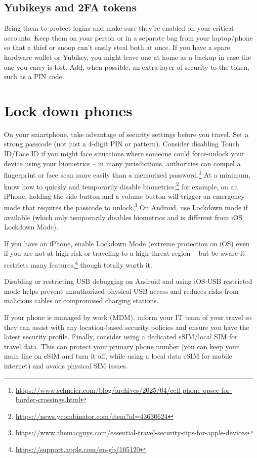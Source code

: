 \subsection{Yubikeys and 2FA tokens}

Bring them to protect logins and make sure they're enabled
on your critical accounts. Keep them on your person or in
a separate bag from your laptop/phone so that a thief or
snoop can't easily steal both at once. If you have a spare
hardware wallet or Yubikey, you might leave one at home as
a backup in case the one you carry is lost. Add, when
possible, an extra layer of security to the token, such as
a PIN code.

\section{Lock down phones}

On your smartphone, take advantage of security settings
before you travel. Set a strong passcode (not just a
4-digit PIN or pattern). Consider disabling Touch ID/Face
ID if you might face situations where someone could
force-unlock your device using your biometrics -- in many
jurisdictions, authorities can compel a fingerprint or
face scan more easily than a memorized
password.\footnote{\url{https://www.schneier.com/blog/archives/2025/04/cell-phone-opsec-for-border-crossings.html}}
At a minimum, know how to quickly and temporarily disable
biometrics;\footnote{\url{https://news.ycombinator.com/item?id=43630624}}
for example, on an iPhone, holding the side button and a
volume button will trigger an emergency mode that requires
the passcode to
unlock.\footnote{\url{https://www.themacguys.com/essential-travel-security-tips-for-apple-devices}}
On Android, use Lockdown mode if available (which only
temporarily disables biometrics and is different from iOS
Lockdown Mode).

If you have an iPhone, enable Lockdown Mode (extreme
protection on iOS) even if you are not at high risk or
traveling to a high-threat region -- but be aware it
restricts many
features,\footnote{\url{https://support.apple.com/en-gb/105120}}
though totally worth it.

Disabling or restricting USB debugging on Android and
using iOS USB restricted mode helps prevent unauthorized
physical USB access and reduces risks from malicious
cables or compromised charging stations.

If your phone is managed by work (MDM), inform your IT
team of your travel so they can assist with any
location-based security policies and ensure you have the
latest security profile. Finally, consider using a
dedicated eSIM/local SIM for travel data. This can protect
your primary phone number (you can keep your main line on
eSIM and turn it off, while using a local data eSIM for
mobile internet) and avoids physical SIM issues.

